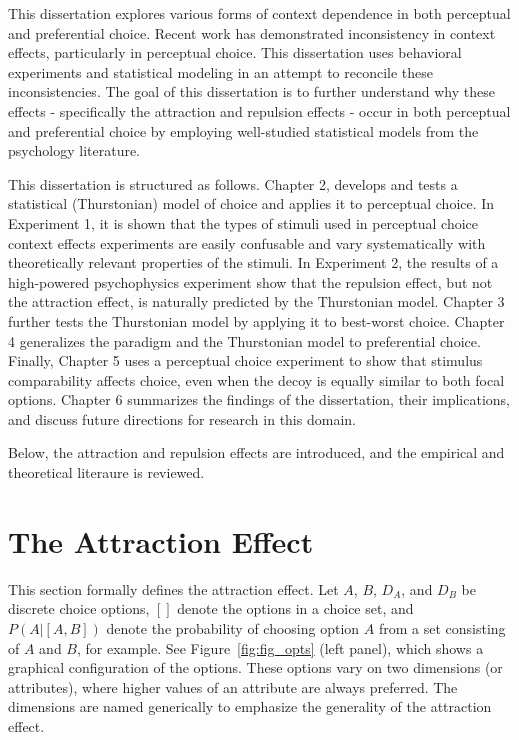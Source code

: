 This dissertation explores various forms of context dependence in both perceptual and preferential choice. Recent work has demonstrated inconsistency in context effects, particularly in perceptual choice. This dissertation uses behavioral experiments and statistical modeling in an attempt to reconcile these inconsistencies. The goal of this dissertation is to further understand why these effects - specifically the attraction and repulsion effects - occur in both perceptual and preferential choice by employing well-studied statistical models from the psychology literature.

This dissertation is structured as follows. Chapter 2, develops and tests a statistical (Thurstonian) model of choice and applies it to perceptual choice. In Experiment 1, it is shown that the types of stimuli used in perceptual choice context effects experiments are easily confusable and vary systematically with theoretically relevant properties of the stimuli. In Experiment 2, the results of a high-powered psychophysics experiment show that the repulsion effect, but not the attraction effect, is naturally predicted by the Thurstonian model. Chapter 3 further tests the Thurstonian model by applying it to best-worst choice. Chapter 4 generalizes the paradigm and the Thurstonian model to preferential choice. Finally, Chapter 5 uses a perceptual choice experiment to show that stimulus comparability affects choice, even when the decoy is equally similar to both focal options. Chapter 6 summarizes the findings of the dissertation, their implications, and discuss future directions for research in this domain. 

Below, the attraction and repulsion effects are introduced, and the empirical and theoretical literaure is reviewed.

\section{The Attraction Effect}
This section formally defines the attraction effect. Let $A$, $B$, $D_{A}$, and $D_{B}$ be discrete choice options, $[]$ denote the options in a choice set, and $P(A|[A,B])$ denote the probability of choosing option $A$ from a set consisting of $A$ and $B$, for example. See Figure~\ref{fig:fig_opts} (left panel), which shows a graphical configuration of the options. These options vary on two dimensions (or attributes), where higher values of an attribute are always preferred. The dimensions are named generically to emphasize the generality of the attraction effect.

